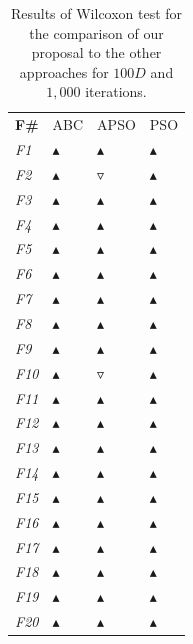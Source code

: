 \begin{table}[!h]
\caption{\small{Results of Wilcoxon test for the comparison of our proposal to the other approaches for $100D$ and $1,000$ iterations.}}
\label{tab:Wilcoxon_100D}
\begin{center}
\begin{tabular}{p{0.5cm}|p{1.5cm}|p{1.5cm}|p{1.5cm}}
\hline\noalign{\smallskip}
\textbf{F\#} & ABC & APSO & PSO    \\		
\noalign{\smallskip}
\hline
\noalign{\smallskip}
\textit{F1}  & $\blacktriangle$  & $\blacktriangle$  & $\blacktriangle$ \\
\textit{F2}  & $\blacktriangle$  & $\triangledown$  & $\blacktriangle$ \\
\textit{F3}  & $\blacktriangle$  & $\blacktriangle$  & $\blacktriangle$ \\
\textit{F4}  & $\blacktriangle$  & $\blacktriangle$  & $\blacktriangle$ \\
\textit{F5}  & $\blacktriangle$  & $\blacktriangle$  & $\blacktriangle$ \\
\textit{F6}  & $\blacktriangle$  & $\blacktriangle$  & $\blacktriangle$ \\
\textit{F7}  & $\blacktriangle$  & $\blacktriangle$  & $\blacktriangle$ \\
\textit{F8}  & $\blacktriangle$  & $\blacktriangle$  & $\blacktriangle$ \\
\textit{F9}  & $\blacktriangle$  & $\blacktriangle$  & $\blacktriangle$ \\
\textit{F10} & $\blacktriangle$  & $\triangledown$  & $\blacktriangle$ \\
\textit{F11} & $\blacktriangle$  & $\blacktriangle$  & $\blacktriangle$ \\
\textit{F12} & $\blacktriangle$  & $\blacktriangle$  & $\blacktriangle$ \\
\textit{F13} & $\blacktriangle$  & $\blacktriangle$  & $\blacktriangle$ \\
\textit{F14} & $\blacktriangle$  & $\blacktriangle$  & $\blacktriangle$ \\
\textit{F15} & $\blacktriangle$  & $\blacktriangle$  & $\blacktriangle$ \\
\textit{F16} & $\blacktriangle$  & $\blacktriangle$  & $\blacktriangle$ \\
\textit{F17} & $\blacktriangle$  & $\blacktriangle$  & $\blacktriangle$ \\
\textit{F18} & $\blacktriangle$  & $\blacktriangle$  & $\blacktriangle$ \\
\textit{F19} & $\blacktriangle$  & $\blacktriangle$  & $\blacktriangle$ \\
\textit{F20} & $\blacktriangle$  & $\blacktriangle$  & $\blacktriangle$ \\
\hline
\end{tabular}
\end{center}
\end{table}


